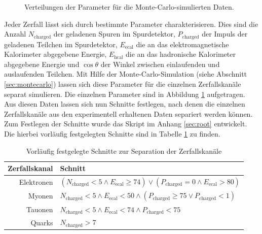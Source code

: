 \begin{figure}
	\caption[Verteilungen der Parameter für die Monte-Carlo-simulierten Daten]{Verteilungen der Parameter für die Monte-Carlo-simulierten Daten.}
	\label{fig:mc}
\end{figure}

Jeder Zerfall lässt sich durch bestimmte Parameter charakterisieren. Dies sind die Anzahl $N_\text{charged}$ der geladenen Spuren im Spurdetektor, $P_\text{charged}$ der Impuls der geladenen Teilchen im Spurdetektor, $E_\text{ecal}$ die an das elektromagnetische Kalorimeter abgegebene Energie, $E_\text{hcal}$ die an das hadronische Kalorimeter abgegebene Energie und $\cos\theta$ der Winkel zwischen einlaufenden und auslaufenden Teilchen. Mit Hilfe der Monte-Carlo-Simulation (siehe Abschnitt \ref{sec:montecarlo}) lassen sich diese Parameter für die einzelnen Zerfallskanäle separat simulieren. Die einzelnen Parameter sind in Abbildung \ref{fig:mc} aufgetragen.\\

Aus diesen Daten lassen sich nun Schnitte festlegen, nach denen die einzelnen Zerfallskanäle aus den experimentell erhaltenen Daten separiert werden können. Zum Festlegen der Schnitte wurde das Skript  im Anhang \ref{sec:root} entwickelt. Die hierbei vorläufig festgelegten Schnitte sind in Tabelle \ref{tab:cuts} zu finden.\\

\begin{table}
	\centering
	\begin{tabular}{r|p{10 cm}}
		\textbf{Zerfallskanal}&\textbf{Schnitt}\\\hline
		Elektronen&$\left(N_\text{charged}<5 \land E_\text{ecal}\geq74\right) \lor \left(P_\text{charged}=0\land E_\text{ecal}>80\right)$\\
		Myonen&$N_\text{charged}<5 \land E_\text{ecal}<50 \land \left(P_\text{charged}\geq 75 \lor P_\text{charged}<1\right)$\\
		Tauonen&$N_\text{charged}<5 \land E_\text{ecal}<74 \land P_\text{charged}< 75$\\
		Quarks&$N_\text{charged}>7$\\
	\end{tabular}
	\caption{Vorläufig festgelegte Schnitte zur Separation der Zerfallskanäle}
	\label{tab:cuts}
\end{table}

